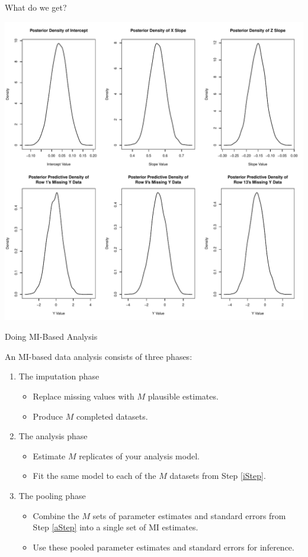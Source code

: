 \documentclass{beamer}\usepackage[]{graphicx}\usepackage[]{color}
\newenvironment{knitrout}{}{} %
\begin{document}
\begin{frame}{What do we get?}
    
\begin{knitrout}\footnotesize
{}\color{fgcolor}

{\centering \includegraphics[width=0.65\linewidth]{figure/unnamed-chunk-15-1} 

}



\end{knitrout}

\end{frame}

\watermarkon %

\begin{frame}{Doing MI-Based Analysis}
  
  An MI-based data analysis consists of three phases:
  \vb
  \begin{enumerate}
  \item The imputation phase \label{iStep}
    \begin{itemize}
    \item Replace missing values with $M$ plausible estimates.
    \item Produce $M$ completed datasets.
    \end{itemize}
    \vb
  \item The analysis phase \label{aStep}
    \begin{itemize}
    \item Estimate $M$ replicates of your analysis model.
    \item Fit the same model to each of the $M$ datasets from Step \ref{iStep}.
    \end{itemize}
    \vb
  \item The pooling phase
    \begin{itemize}
    \item Combine the $M$ sets of parameter estimates and standard errors from 
      Step \ref{aStep} into a single set of MI estimates.
    \item Use these pooled parameter estimates and standard errors for 
      inference.
    \end{itemize}
  \end{enumerate}
  
\end{frame}
\end{document}
